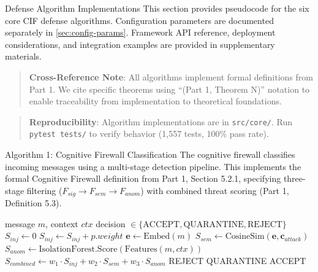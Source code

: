 \documentclass[
  ignorenonframetext,
]{beamer}
\author{\texorpdfstring{}{}}
\date{}
\begin{document}
\begin{frame}
\newpage
\end{frame}

\begin{frame}[fragile]{Defense Algorithm Implementations}
\protect{}\label{sec:pseudocode}
This section provides pseudocode for the six core CIF defense
algorithms. Configuration parameters are documented separately in
\cref{sec:config-params}. Framework API reference, deployment
considerations, and integration examples are provided in supplementary
materials.

\begin{quote}
\textbf{Cross-Reference Note}: All algorithms implement formal
definitions from Part 1. We cite specific theorems using ``(Part 1,
Theorem N)'' notation to enable traceability from implementation to
theoretical foundations.
\end{quote}

\begin{quote}
\textbf{Reproducibility}: Algorithm implementations are in
\texttt{src/core/}. Run \texttt{pytest\ tests/} to verify behavior
(1,557 tests, 100\% pass rate).
\end{quote}

\begin{block}{Algorithm 1: Cognitive Firewall Classification}
\protect{}\label{sec:alg-firewall}
The cognitive firewall classifies incoming messages using a multi-stage
detection pipeline. This implements the formal Cognitive Firewall
definition from Part 1, Section 5.2.1, specifying three-stage filtering
(\(F_{sig} \to F_{sem} \to F_{anom}\)) with combined threat scoring
(Part 1, Definition 5.3).

\begin{algorithm}
\caption{Cognitive Firewall Classification}
\label{alg:firewall-impl}
\begin{algorithmic}[1]
\Require message $m$, context $ctx$
\Ensure decision $\in \{\text{ACCEPT}, \text{QUARANTINE}, \text{REJECT}\}$
  \State {}
  \State $S_{inj} \gets 0$
      \State $S_{inj} \gets S_{inj} + p.weight$
    \EndIf
  \EndFor
  \State {}
  \State $\mathbf{e} \gets \text{Embed}(m)$
  \State $S_{sem} \gets \text{CosineSim}(\mathbf{e}, \mathbf{c}_{attack})$
  \State {}
  \State $S_{anom} \gets \text{IsolationForest.Score}(\text{Features}(m, ctx))$
  \State {}
  \State $S_{combined} \gets w_1 \cdot S_{inj} + w_2 \cdot S_{sem} + w_3 \cdot S_{anom}$
  \State {}
    \State \Return REJECT
    \State \Return QUARANTINE
  \Else
    \State \Return ACCEPT
  \EndIf
\EndFunction
\end{algorithmic}
\end{algorithm}


\end{block}
\end{frame}
\end{document}
